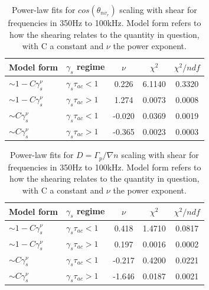 \documentclass[aip,pop,amsmath,amssymb,reprint,superscriptaddress]{revtex4-1} %
\begin{document}
\begin{table}
\caption{\label{tab:table4}Power-law fits for $cos(\theta_{nv_{r}})$ scaling with shear for frequencies in 350Hz to 100kHz. Model form refers to how the shearing relates to the quantity in question, with C a constant and $\nu$ the power exponent.}
\begin{ruledtabular}
\begin{tabular}{llccc}
Model form&$\gamma_{s}$ regime&$\nu$&$\chi^2$&$\chi^2/ndf$\\
\hline
$\sim 1-C\gamma_{s}^\nu$&$\gamma_{s}\tau_{ac}<1$ &0.226   &6.1140    &0.3320\\
$\sim 1-C\gamma_{s}^\nu$&$\gamma_{s}\tau_{ac}>1$ &1.274   &0.0073    &0.0008\\
$\sim C\gamma_{s}^\nu$&$\gamma_{s}\tau_{ac}<1$   &-0.020  &0.0369    &0.0019\\
$\sim C\gamma_{s}^\nu$&$\gamma_{s}\tau_{ac}>1$   &-0.365  &0.0023    &0.0003\\
\end{tabular}
\end{ruledtabular}
\end{table}

\begin{table}
\caption{\label{tab:table5}Power-law fits for $D = \Gamma_{p}/\nabla{n}$ scaling with shear for frequencies in 350Hz to 100kHz. Model form refers to how the shearing relates to the quantity in question, with C a constant and $\nu$ the power exponent.}
\begin{ruledtabular}
\begin{tabular}{llccc}
Model form&$\gamma_{s}$ regime&$\nu$&$\chi^2$&$\chi^2/ndf$\\
\hline
$\sim 1-C\gamma_{s}^\nu$&$\gamma_{s}\tau_{ac}<1$ &0.418   &1.4710    &0.0817\\
$\sim 1-C\gamma_{s}^\nu$&$\gamma_{s}\tau_{ac}>1$ &0.197   &0.0016    &0.0002\\
$\sim C\gamma_{s}^\nu$&$\gamma_{s}\tau_{ac}<1$   &-0.217  &0.4200    &0.0221\\
$\sim C\gamma_{s}^\nu$&$\gamma_{s}\tau_{ac}>1$   &-1.646  &0.0187    &0.0021\\
\end{tabular}
\end{ruledtabular}
\end{table}
\end{document}
